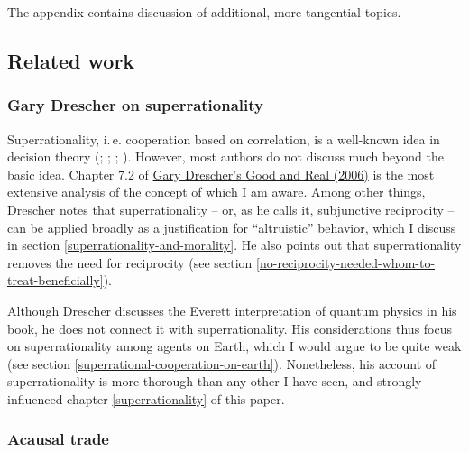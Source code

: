 The appendix contains discussion of additional, more tangential topics.

\hypertarget{related-work}{\subsection{Related
work}\label{related-work}}

\hypertarget{gary-drescher-on-superrationality}{\subsubsection{Gary
Drescher on superrationality}\label{gary-drescher-on-superrationality}}

Superrationality, i.\,e. cooperation based on correlation, is a well-known
idea in decision theory
(\cite[section 7]{Kuhn2017-tl}; \cite[section X]{Horgan1981-hb};
\cite{Hofstadter1983-az,Campbell1985-sx}; \cite[section 4.6 and references therein]{Ahmed2014-ec}).
However, most authors do not discuss much beyond the basic idea. Chapter
7.2 of
\href{https://www.gwern.net/docs/2006-drescher-goodandreal.pdf}{Gary
Drescher's Good and Real (2006)} is the most extensive analysis
of the concept of which I am aware. Among other things, Drescher notes
that superrationality -- or, as he calls it, subjunctive reciprocity --
can be applied broadly as a justification for ``altruistic'' behavior,
which I discuss in section
\ref{superrationality-and-morality}. He also points out that superrationality removes the
need for reciprocity (see section
\ref{no-reciprocity-needed-whom-to-treat-beneficially}).

Although Drescher discusses the Everett interpretation of quantum
physics in his book, he does not connect it with superrationality. His
considerations thus focus on superrationality among agents on Earth,
which I would argue to be quite weak (see section
\ref{superrational-cooperation-on-earth}). Nonetheless, his account of superrationality is more
thorough than any other I have seen, and strongly influenced chapter \ref{superrationality} of this
paper.

\hypertarget{acausal-trade}{\subsubsection{Acausal
trade}\label{acausal-trade}}

